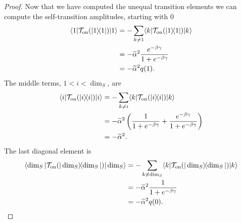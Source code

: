 \documentclass{article}
\newcommand{\on}{\rm on}
\newcommand{\ket}[1]{|#1\rangle}
\newcommand{\bra}[1]{\langle #1|}
\newcommand{\ketbra}[2]{| #1\rangle\! \langle #2|}
\begin{document}
\begin{proof}
Now that we have computed the unequal transition elements we can compute the self-transition amplitudes, starting with $0$
\begin{align}
    \bra{1} \mathcal{T}_{\on}(\ketbra{1}{1}) \ket{1} &= - \sum_{k \neq 1} \bra{k} \mathcal{T}_{\on}(\ketbra{1}{1}) \ket{k} \\
    &= - \widetilde{\alpha}^2 \frac{e^{-\beta \gamma}}{1 + e^{-\beta \gamma}} \\
    &= - \widetilde{\alpha}^2 q(1). \label{eq:sho_diagonal_transition_1}
\end{align}
The middle terms, $1 < i < \dim_S$, are 
\begin{align}
    \bra{i}\mathcal{T}_{\on}(\ketbra{i}{i}) \ket{i} &= - \sum_{k \neq i}  \bra{k} \mathcal{T}_{\on}(\ketbra{i}{i}) \ket{k} \\
    &= -\widetilde{\alpha}^2 \left( \frac{1}{1 + e^{-\beta \gamma}} + \frac{e^{-\beta \gamma}}{1 + e^{-\beta \gamma}} \right) \\
    &= -\widetilde{\alpha}^2. \label{eq:sho_diagonal_transition_2}
\end{align}
The last diagonal element is
\begin{align}
    \bra{\dim_S} \mathcal{T}_{\on}(\ketbra{\dim_S}{\dim_S}) \ket{\dim_S} &= - \sum_{k \neq \dim_S} \bra{k} \mathcal{T}_{\on}(\ketbra{\dim_S}{\dim_S}) \ket{k} \\
    &= - \widetilde{\alpha}^2 \frac{1}{1 + e^{-\beta \gamma}} \\
    &= - \widetilde{\alpha}^2 q(0). \label{eq:sho_diagonal_transition_3}
\end{align}


\end{proof}
\end{document}
